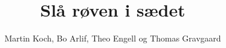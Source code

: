 \documentclass[10pt]{article}
\title{Slå røven i sædet}
\author{Martin Koch, Bo Arlif, Theo Engell og Thomas Gravgaard}
\begin{document}
\twocolumn[ %
\maketitle

]
\begin{song}
                                        
                                        
                                        
                                        
                                        
                                        
                                        
                                        
                                        
                                        
                                        

\end{song}
\end{document}
